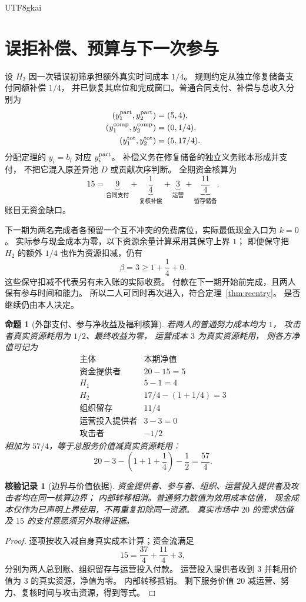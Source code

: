 \documentclass[12pt,a4paper,openany]{report}
\newtheorem{proposition}{命题}[chapter]
\newtheorem{Certificate}{核验记录}[chapter]
\begin{document}
\begin{CJK*}{UTF8}{gkai}
\section{误拒补偿、预算与下一次参与}
设 \(H_2\) 因一次错误初筛承担额外真实时间成本 \(1/4\)。
规则约定从独立修复储备支付同额补偿 \(1/4\)，
并已恢复其席位和完成窗口。普通合同支付、补偿与总收入分别为
\[
\begin{aligned}
(y_1^{\rm part},y_2^{\rm part})&=(5,4),\\
(y_1^{\rm comp},y_2^{\rm comp})&=(0,1/4),\\
(y_1^{\rm tot},y_2^{\rm tot})&=(5,17/4).
\end{aligned}
\]
分配定理的 \(y_i=b_i\) 对应 \(y_i^{\rm part}\)。
补偿义务在修复储备的独立义务账本形成并支付，
不把它混入原差异池 \(D\) 或贡献次序判断。
全期资金核算为
\[
15=
\underbrace{9}_{\text{合同支付}}
+\underbrace{\frac14}_{\text{复核补偿}}
+\underbrace{3}_{\text{运营}}
+\underbrace{\frac{11}{4}}_{\text{留存储备}}.
\]
账目无资金缺口。

下一期为两名完成者各预留一个互不冲突的免费席位，实际最低现金入口为 \(k=0\)。
实际参与现金成本为零，以下资源余量计算采用其保守上界 \(1\)；
即便保守把 \(H_2\) 的额外 \(1/4\) 也作为资源扣减，仍有
\[
\beta=3\ge1+\frac14+0.
\]
这些保守扣减不代表另有未入账的实际收费。
付款在下一期开始前完成，且两人保有参与时间和能力。
所以二人可同时再次进入，符合定理~\ref{thm:reentry}。
是否继续仍由本人决定。

\begin{proposition}[外部支付、参与净收益及福利核算]
\label{prop:example-welfare}
若两人的普通努力成本均为 \(1\)，
攻击者真实资源耗用为 \(1/2\)、最终收益为零，
运营成本 \(3\) 为真实资源耗用，
则各方净值可记为
\[
\begin{array}{c|c}
\text{主体}&\text{本期净值}\\ \hline
\text{资金提供者}&20-15=5\\
H_1&5-1=4\\
H_2&17/4-(1+1/4)=3\\
\text{组织留存}&11/4\\
\text{运营投入提供者}&3-3=0\\
\text{攻击者}&-1/2
\end{array}
\]
相加为 \(57/4\)，等于总服务价值减真实资源耗用：
\[
20-3-\left(1+1+\frac14\right)-\frac12=\frac{57}{4}.
\]
\end{proposition}
\begin{Certificate}[边界与价值依据]
资金提供者、参与者、组织、运营投入提供者及攻击者均在同一核算边界；
内部转移相消。普通努力数值为效用成本估值，
现金成本仅作为已声明上界使用，不再重复扣除同一资源。
真实市场中 \(20\) 的需求估值及 \(15\) 的支付意愿须另外取得证据。
\end{Certificate}
\begin{proof}
逐项按收入减自身真实成本计算；资金流满足
\[
15=\frac{37}{4}+\frac{11}{4}+3,
\]
分别为两人总到账、组织留存与运营投入付款。
运营投入提供者收到 \(3\) 并耗用价值为 \(3\) 的真实资源，净值为零。
内部转移抵销。
剩下服务价值 \(20\) 减运营、努力、复核时间与攻击资源，得到等式。
\end{proof}


\end{CJK*}
\end{document}
